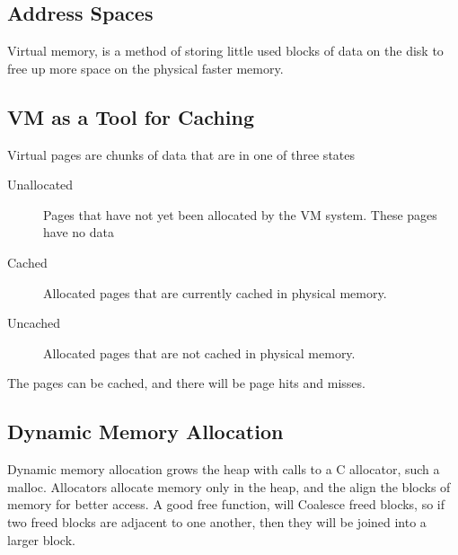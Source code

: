 \documentclass[10pt]{armath}
\begin{document}
\subsection{Address Spaces}%
\label{sub:address_spaces}

Virtual memory, is a method of storing little used blocks of data on the disk
to free up more space on the physical faster memory.

\subsection{VM as a Tool for Caching}%
\label{sub:vm_as_a_tool_for_caching}

Virtual pages are chunks of data that are in one of three states
\begin{description}
  \item[Unallocated] Pages that have not yet been allocated by the VM system.
    These pages have no data
  \item[Cached] Allocated pages that are currently cached in physical memory.
  \item[Uncached] Allocated pages that are not cached in physical memory.
\end{description}
The pages can be cached, and there will be page hits and misses.

\subsection{Dynamic Memory Allocation}%
\label{sub:dynamic_memory_allocation}

Dynamic memory allocation grows the heap with calls to a C allocator, such a
malloc. Allocators allocate memory only in the heap, and the align the blocks
of memory for better access. A good free function, will Coalesce freed blocks,
so if two freed blocks are adjacent to one another, then they will be joined
into a larger block.
\end{document}
